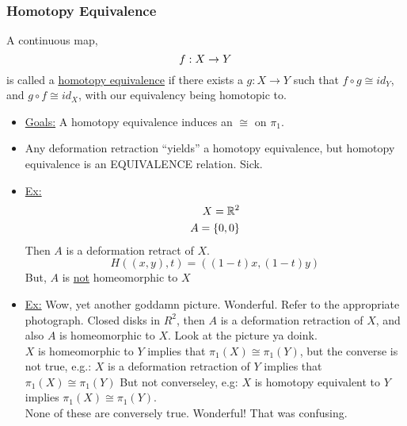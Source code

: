 \subsubsection{Homotopy Equivalence}
\begin{definition}
    A continuous map,
    \[
        f: X\rightarrow Y\\
    \]
    is called a \underline{homotopy equivalence} if there exists a $g:X\rightarrow Y$ such
    that $f\circ g\cong id_Y$, and $g\circ f \cong id_X$, with our equivalency being
    homotopic to.
\end{definition}
\begin{itemize}
    \item \underline{Goals:} A homotopy equivalence induces an $\cong$ on $\pi_1$.
    \item Any deformation retraction ``yields'' a homotopy equivalence, but homotopy
        equivalence is an EQUIVALENCE relation. Sick.
    \item \underline{Ex:}
        \begin{align*}
            X=\mathbb{R}^2\\
            A=\{0,0\}\\
        \end{align*}
        Then $A$ is a deformation retract of $X$.
        \[
            H((x,y),t)=((1-t)x,(1-t)y)
        \]
        But, $A$ is \underline{not} homeomorphic to $X$
    \item \underline{Ex:}
        Wow, yet another goddamn picture. Wonderful. Refer to the appropriate photograph.
        Closed disks in $R^2$, then $A$ is a deformation retraction of $X$, and also
        $A$ is homeomorphic to $X$. Look at the picture ya doink.\\
        $X$ is homeomorphic to $Y$ implies that $\pi_1(X)\cong\pi_1(Y)$, but the
        converse is not true, e.g.:
        $X$ is a deformation retraction of $Y$ implies that $\pi_1(X)\cong \pi_1(Y)$
        But not converseley, e.g:
        $X$ is homotopy equivalent to $Y$ implies $\pi_1(X)\cong \pi_1(Y)$.\\
        None of these are conversely true. Wonderful! That was confusing.
\end{itemize}
